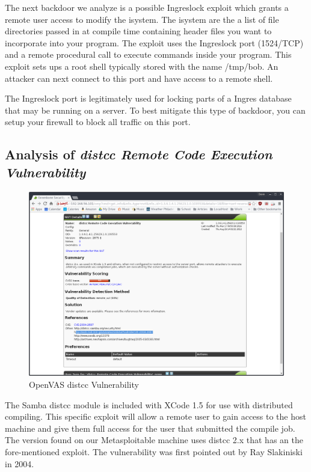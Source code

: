 \documentclass[12pt]{article}
\begin{document}
The next backdoor we analyze is a possible Ingreslock exploit which
grants a remote user access to modify the isystem. The isystem are the a 
list of file directories passed in at compile time containing header files 
you want to incorporate into your program. The exploit uses the Ingreslock 
port (1524/TCP) and a remote procedural call to execute commands inside 
your program. This exploit sets ups a root shell typically stored with the
name /tmp/bob. An attacker can next connect to this port and have access to 
a remote shell.

The Ingreslock port is legitimately used for locking parts of a Ingres
database that may be running on a server. To best mitigate this type of 
backdoor, you can setup your firewall to block all traffic on this port. 

\subsection{Analysis of \textit{distcc Remote Code Execution Vulnerability}}
\label{sec:vul3}

\begin{figure}[H]
    \centering
    \includegraphics[width=5.5in]{images/20160405-vul2-distcc.png}
    \caption{OpenVAS distcc Vulnerability}
    \label{fig:distcc}
\end{figure}

The Samba distcc module is included with XCode 1.5 for use with distributed
compiling. This specific exploit will allow a remote user to gain access
to the host machine and give them full access for the user that submitted the
compile job. The version found on our Metasploitable machine uses distcc 2.x
that has an the fore-mentioned exploit. The vulnerability was first pointed
out by Ray Slakiniski in 2004. 
\end{document}
